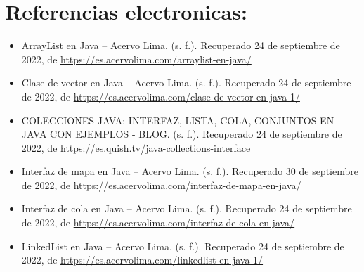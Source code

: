 \documentclass[12pt, letterpaper]{article} %
\begin{document}
\section*{Referencias electronicas:}
\begin{itemize}
    \item ArrayList en Java – Acervo Lima. (s. f.). Recuperado 24 de septiembre de 2022, de \href{https://bit.ly/3fB4HAN}{https://es.acervolima.com/arraylist-en-java/}
    
    \item Clase de vector en Java – Acervo Lima. (s. f.). Recuperado 24 de septiembre de 2022, de \href{https://es.acervolima.com/clase-de-vector-en-java-1/}{https://es.acervolima.com/clase-de-vector-en-java-1/}
    
    \item COLECCIONES JAVA: INTERFAZ, LISTA, COLA, CONJUNTOS EN JAVA CON EJEMPLOS - BLOG. (s. f.). Recuperado 24 de septiembre de 2022, de \href{https://es.quish.tv/java-collections-interface}{https://es.quish.tv/java-collections-interface}
    
    \item Interfaz de mapa en Java – Acervo Lima. (s. f.). Recuperado 30 de septiembre de 2022, de \href{https://es.acervolima.com/interfaz-de-mapa-en-java/}{https://es.acervolima.com/interfaz-de-mapa-en-java/}
    
    \item Interfaz de cola en Java – Acervo Lima. (s. f.). Recuperado 24 de septiembre de 2022, de \href{https://es.acervolima.com/interfaz-de-cola-en-java/}{https://es.acervolima.com/interfaz-de-cola-en-java/}
    
    \item LinkedList en Java – Acervo Lima. (s. f.). Recuperado 24 de septiembre de 2022, de \href{https://es.acervolima.com/linkedlist-en-java-1/}{https://es.acervolima.com/linkedlist-en-java-1/}
\end{itemize}
\end{document}
